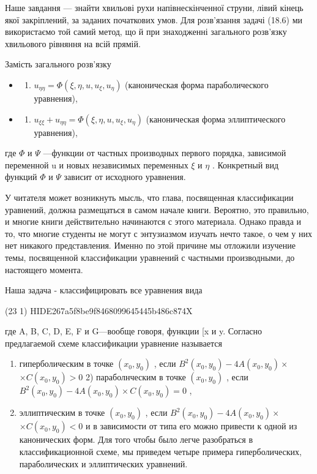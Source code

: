 \documentclass[
  ukrainian,
]{article}
\providecommand{\tightlist}{%
  \setlength{\itemsep}{0pt}\setlength{\parskip}{0pt}}
\begin{document}
Наше завдання --- знайти хвильові рухи напівнескінченної струни, лівий
кінець якої закріплений, за заданих початкових умов. Для розв'язання
задачі (18.6) ми використаємо той самий метод, що й при знаходженні
загального розв'язку хвильового рівняння на всій прямій.

Замість загального розв'язку

\begin{itemize}
\tightlist
\item
  \begin{enumerate}
  \def\labelenumi{\arabic{enumi}.}
  \setcounter{enumi}{1}
  \tightlist
  \item
    \(u_{\eta\eta} = \Phi(\xi, \eta, u, u_{\xi}, u_{\eta})\)
    (каноническая форма параболического уравнения),
  \end{enumerate}
\item
  \begin{enumerate}
  \def\labelenumi{\arabic{enumi}.}
  \setcounter{enumi}{2}
  \tightlist
  \item
    \(u_{\xi\xi} + u_{\eta\eta} = \Phi(\xi, \eta, u, u_{\xi}, u_{\eta})\)
    (каноническая форма эллиптического уравнения),
  \end{enumerate}
\end{itemize}

где \(\Phi\) и \(\Psi\) ---функции от частных производных первого
порядка, зависимой переменной u и новых независимых переменных \(\xi\) и
\(\eta\) . Конкретный вид функций \(\Phi\) и \(\Psi\) зависит от
исходного уравнения.

У читателя может возникнуть мысль, что глава, посвященная классификации
уравнений, должна размещаться в самом начале книги. Вероятно, это
правильно, и многие книги действительно начинаются с этого материала.
Однако правда и то, что многие студенты не могут с энтузиазмом изучать
нечто такое, о чем у них нет никакого представления. Именно по этой
причине мы отложили изучение темы, посвященной классификации уравнений с
частными производными, до настоящего момента.

Наша задача - классифицировать все уравнения вида

(23 1) HIDE267a5f8be9f8468099645445b486c874X

где A, B, C, D, E, F и G---вообще говоря, функции {[}x и y. Согласно
предлагаемой схеме классификации уравнение называется

\begin{enumerate}
\def\labelenumi{\arabic{enumi})}
\item
  гиперболическим в точке \((x_0, y_0)\) , если
  \(B^2(x_0, y_0) - 4A(x_0, y_0) \times\) \(\times C(x_0, y_0) > 0\) 2)
  параболнческим в точке \((x_0, y_0)\) , если
  \(B^2(x_0, y_0) - 4A(x_0, y_0) \times C(x_0, y_0) = 0\) ,
\item
  эллиптическим в точке \((x_0, y_0)\) , если
  \(B^2(x_0, y_0) - 4A(x_0, y_0) \times\) \(\times C(x_0, y_0) < 0\) и в
  зависимости от типа его можно привести к одной из канонических форм.
  Для того чтобы было легче разобраться в классификационной схеме, мы
  приведем четыре примера гиперболических, параболических и
  эллиптических уравнений.
\end{enumerate}
\end{document}
